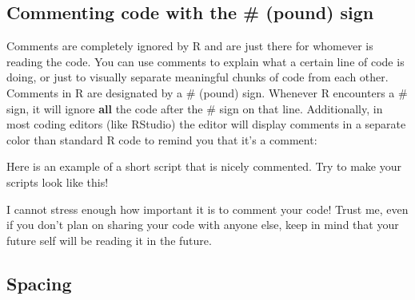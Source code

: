\documentclass[]{book}
\newenvironment{Shaded}{\begin{snugshade}}{\end{snugshade}}
\newcommand{\KeywordTok}[1]{\textcolor[rgb]{0.13,0.29,0.53}{\textbf{#1}}}
\newcommand{\DataTypeTok}[1]{\textcolor[rgb]{0.13,0.29,0.53}{#1}}
\newcommand{\StringTok}[1]{\textcolor[rgb]{0.31,0.60,0.02}{#1}}
\newcommand{\CommentTok}[1]{\textcolor[rgb]{0.56,0.35,0.01}{\textit{#1}}}
\newcommand{\OperatorTok}[1]{\textcolor[rgb]{0.81,0.36,0.00}{\textbf{#1}}}
\newcommand{\NormalTok}[1]{#1}
\theoremstyle{definition}
\theoremstyle{definition}
\theoremstyle{remark}
\begin{document}
\subsection{Commenting code with the \# (pound)
sign}\label{commenting-code-with-the-pound-sign}

Comments are completely ignored by R and are just there for whomever is
reading the code. You can use comments to explain what a certain line of
code is doing, or just to visually separate meaningful chunks of code
from each other. Comments in R are designated by a \# (pound) sign.
Whenever R encounters a \# sign, it will ignore \textbf{all} the code
after the \# sign on that line. Additionally, in most coding editors
(like RStudio) the editor will display comments in a separate color than
standard R code to remind you that it's a comment:

Here is an example of a short script that is nicely commented. Try to
make your scripts look like this!

\begin{Shaded}
\end{Shaded}

I cannot stress enough how important it is to comment your code! Trust
me, even if you don't plan on sharing your code with anyone else, keep
in mind that your future self will be reading it in the future.

\subsection{Spacing}\label{spacing}
\end{document}
